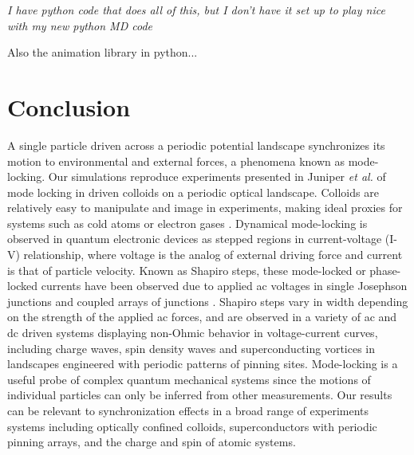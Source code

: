 \documentclass[twocolumn,preprintnumbers,amsmath,amssymb,aps,prx]{revtex4}
\begin{document}
  {\it I have python code that does all of this, but I don't have it
    set up to play nice with my new python MD code}
  
  Also the animation library in python...

\section{Conclusion}
\label{sec:conclusion}	%

A single particle driven across a periodic potential landscape 
synchronizes its motion %
to environmental and external forces,
a phenomena known as mode-locking.  
Our simulations reproduce experiments presented in 
Juniper {\it et al.} \cite{Juniper2015} %
of 
mode locking in
driven colloids on a
periodic optical landscape.
Colloids are 
relatively easy to 
manipulate and image in experiments,
making ideal proxies 
for systems %
such as cold atoms or electron gases \cite{Grier2003}.
Dynamical mode-locking %
is %
observed
in quantum electronic
devices %
as 
stepped regions in current-voltage (I-V) relationship,
where voltage is the analog of external driving force
and current is that of particle velocity.
Known as Shapiro steps, %
these mode-locked or phase-locked currents  
have been observed due to applied ac voltages in 
single Josephson junctions \cite{Shapiro1963, Golubov2004} and
coupled arrays of junctions \cite{Benz1990}.
Shapiro steps vary in width depending on the strength of the
applied ac forces,
and are observed in a variety of ac and dc driven systems
displaying
non-Ohmic behavior in voltage-current curves,
including
charge waves, spin density waves
and superconducting vortices in landscapes 
engineered with periodic patterns of pinning sites.
Mode-locking is a useful probe 
of complex quantum mechanical systems
since the motions of individual particles can only be inferred
from other measurements.
Our results can be relevant 
to synchronization effects
in a broad range of experiments systems
including optically confined colloids,
superconductors with periodic pinning arrays, 
and the charge and spin of atomic systems.
\end{document}
